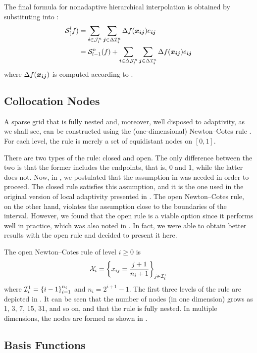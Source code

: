The final formula for nonadaptive hierarchical interpolation is obtained by
substituting  into :
\begin{align*}
  \mathcal{S}^{l}_{(}f) &= \sum_{\boldsymbol{i} \in \mathcal{J}^{n}_{l}} \sum_{\boldsymbol{j} \in \Delta\mathcal{I}^{n}_{\boldsymbol{i}}} \Delta f(\boldsymbol{x}_{\boldsymbol{i} \boldsymbol{j}}) e_{\boldsymbol{i} \boldsymbol{j}} \\
                &= \mathcal{S}^{n}_{l - 1}(f) + \sum_{\boldsymbol{i} \in \Delta\mathcal{J}^{n}_{l}} \sum_{\boldsymbol{j} \in \Delta\mathcal{I}^{n}_{\boldsymbol{i}}} \Delta f(\boldsymbol{x}_{\boldsymbol{i} \boldsymbol{j}}) e_{\boldsymbol{i} \boldsymbol{j}}
\end{align*}
where $\Delta f(\boldsymbol{x}_{\boldsymbol{i} \boldsymbol{j}})$ is computed according to .

\subsection{Collocation Nodes}

A sparse grid that is fully nested and, moreover, well disposed to adaptivity,
as we shall see, can be constructed using the (one-dimensional) Newton--Cotes
rule \cite{ma2009}. For each level, the rule is merely a set of equidistant
nodes on $[0, 1]$.

There are two types of the rule: closed and open. The only difference between
the two is that the former includes the endpoints, that is, 0 and 1, while the
latter does not. Now, in , we postulated that the assumption in
 was needed in order to proceed. The closed rule
satisfies this assumption, and it is the one used in the original version of
local adaptivity presented in \cite{ma2009}. The open Newton--Cotes rule, on the
other hand, violates the assumption close to the boundaries of the interval.
However, we found that the open rule is a viable option since it performs well
in practice, which was also noted in \cite{klimke2006}. In fact, we were able to
obtain better results with the open rule and decided to present it here.

The open Newton--Cotes rule of level $i \geq 0$ is
\[
  \mathcal{X}_i = \left\{ x_{ij} = \frac{j + 1}{n_i + 1} \right\}_{j \in \mathcal{I}^{1}_{i}}
\]
where $\mathcal{I}^{1}_{i} = \left\{ i - 1 \right\}_{i = 1}^{n_i}$ and $n_i =
2^{i + 1} - 1$. The first three levels of the rule are depicted in .
It can be seen that the number of nodes (in one dimension) grows as 1, 3, 7, 15,
31, and so on, and that the rule is fully nested. In multiple dimensions, the
nodes are formed as shown in .

\subsection{Basis Functions}

